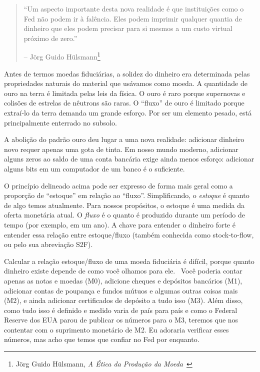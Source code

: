 \begin{samepage}\begin{quotation}
\enquote{Um aspecto importante desta nova realidade é que instituições como o Fed não podem ir à falência. Eles podem imprimir qualquer quantia de dinheiro que eles podem precisar para si mesmos a um custo virtual próximo de zero.}
\begin{flushright} -- Jörg Guido Hülsmann\footnote{Jörg Guido Hülsmann, \textit{A Ética da Produção da Moeda}~\cite{hulsmann2008ethics}}
\end{flushright}\end{quotation}\end{samepage}

Antes de termos moedas fiduciárias, a solidez do dinheiro era determinada pelas propriedades naturais do material que usávamos como moeda. A quantidade de ouro na terra é limitada pelas leis da física. O ouro é raro porque supernovas e colisões de estrelas de nêutrons são raras. O \enquote{fluxo} de ouro é limitado porque extraí-lo da terra demanda um grande esforço. Por ser um elemento pesado, está principalmente enterrado no subsolo.

A abolição do padrão ouro deu lugar a uma nova realidade: adicionar dinheiro novo requer apenas uma gota de tinta. Em nosso mundo moderno, adicionar alguns zeros ao saldo de uma conta bancária exige ainda menos esforço: adicionar alguns bits em um computador de um banco é o suficiente.

O princípio delineado acima pode ser expresso de forma mais geral como a proporção de \enquote{estoque} em relação ao \enquote{fluxo}. Simplificando, o \textit{estoque} é quanto de algo temos atualmente. Para nossos propósitos, o estoque é uma medida da oferta monetária atual. O \textit{fluxo} é o quanto é produzido durante um período de tempo (por exemplo, em um ano). A chave para entender o dinheiro forte é entender essa relação entre estoque/fluxo (também conhecida como stock-to-flow, ou pelo sua abreviação S2F).

Calcular a relação estoque/fluxo de uma moeda fiduciária é difícil, porque quanto dinheiro existe depende de como você olhamos para ele.~\cite{wiki:money-supply} Você poderia contar apenas as notas e moedas (M0), adicione cheques e depósitos bancários (M1), adicionar contas de poupança e fundos mútuos e algumas outras coisas mais (M2), e ainda adicionar certificados de depósito a tudo isso (M3). Além disso, como tudo isso é definido e medido varia de país para país e como o Federal Reserve dos EUA parou de publicar os números \cite{web:fed-m3} para o M3, teremos que nos contentar com o suprimento monetário de M2. Eu adoraria verificar esses números, mas acho que temos que confiar no Fed por enquanto.

